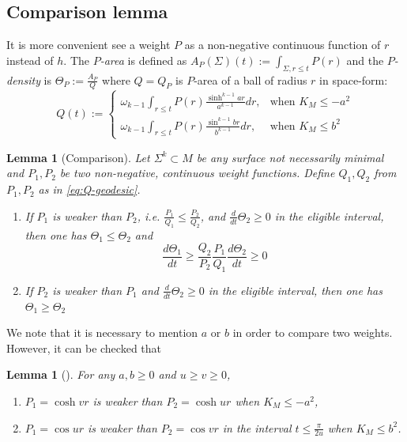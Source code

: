 \documentclass[11pt]{article}
\newtheorem{lemma}[theorem]{Lemma}
\begin{document}
\subsection{Comparison lemma}
\label{sec:orgffa9b3c}
It is more convenient see a weight \(P\) as a non-negative
continuous function of \(r\) instead of \(h\). The \emph{\(P\)-area} is defined as \(A_P(\Sigma)(t):= \int_{\Sigma, r\leq t}P(r)\) and the \emph{\(P\)-density} is \(\Theta_P:= \frac{A_P}{Q}\) where \(Q = Q_P\) is
\(P\)-area of a ball of radius \(r\) in space-form:
\begin{equation}
\label{eq:Q-geodesic}
 Q(t):= \begin{cases}
\omega_{k-1}\int_{r\leq t}P(r)\frac{\sinh^{k-1} ar}{a^{k-1}}dr       ,  & \text{when } K_M\leq -a^2 \\
\omega_{k-1}\int_{r\leq t}P(r)\frac{\sin^{k-1} br}{b^{k-1}}dr       , & \text{when } K_M\leq b^2
       \end{cases}
\end{equation}

\begin{lemma}[Comparison]
\label{lem:comparison-geodesic}
Let \(\Sigma^k\subset M\) be any surface not necessarily minimal and \(P_1,P_2\) be two
non-negative, continuous weight functions. Define \(Q_1, Q_2\) from \(P_1,
P_2\) as in \eqref{eq:Q-geodesic}. 
\begin{enumerate}
\item If \(P_1\) is weaker than \(P_2\), i.e. \(\frac{P_1}{Q_1} \leq
   \frac{P_2}{Q_2}\), and \(\frac{d}{dt}\Theta_2\geq 0\) in the eligible interval, then one has \(\Theta_1\leq\Theta_2\)
and
 \[
  \frac{d\Theta_1}{dt} \geq \frac{Q_2}{P_2}\frac{P_1}{Q_1} \frac{d\Theta_2}{dt}\geq 0
  \]
\item If \(P_2\) is weaker than \(P_1\) and \(\frac{d}{dt}\Theta_2\geq 0\) in the eligible interval, then one has \(\Theta_1\geq\Theta_2\)
\end{enumerate}
\end{lemma}

We note that it is necessary to mention \(a\) or \(b\) in order to compare two
weights. However, it can be checked that
\begin{lemma}[]
\label{lem:compare-geodesic}
For any \(a, b\geq 0\) and \(u\geq v \geq 0\),
\begin{enumerate}
\item \(P_1 = \cosh v r\) is weaker than \(P_2 = \cosh ur\) when \(K_M\leq -a^2\),
\item \(P_1 = \cos ur\) is weaker than \(P_2 = \cos vr\) in the interval \(t \leq \frac{\pi}{2u}\) when \(K_M\leq b^2\).
\end{enumerate}
\end{lemma}
\end{document}
